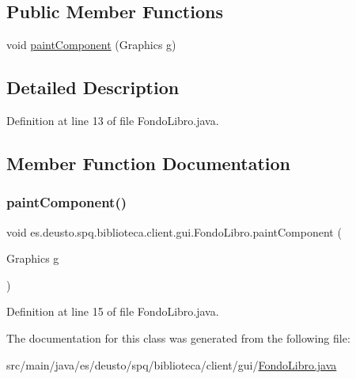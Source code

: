 \subsection*{Public Member Functions}
\begin{DoxyCompactItemize}
\item 
void \mbox{\hyperlink{classes_1_1deusto_1_1spq_1_1biblioteca_1_1client_1_1gui_1_1_fondo_libro_ace9f012294362dac9d16fb3876527435}{paint\+Component}} (Graphics g)
\end{DoxyCompactItemize}


\subsection{Detailed Description}


Definition at line 13 of file Fondo\+Libro.\+java.



\subsection{Member Function Documentation}
\mbox{\label{classes_1_1deusto_1_1spq_1_1biblioteca_1_1client_1_1gui_1_1_fondo_libro_ace9f012294362dac9d16fb3876527435}} 
\subsubsection{\texorpdfstring{paint\+Component()}{paintComponent()}}
{\footnotesize\ttfamily void es.\+deusto.\+spq.\+biblioteca.\+client.\+gui.\+Fondo\+Libro.\+paint\+Component (\begin{DoxyParamCaption}\item[{Graphics}]{g }\end{DoxyParamCaption})}



Definition at line 15 of file Fondo\+Libro.\+java.



The documentation for this class was generated from the following file\+:\begin{DoxyCompactItemize}
\item 
src/main/java/es/deusto/spq/biblioteca/client/gui/\mbox{\hyperlink{_fondo_libro_8java}{Fondo\+Libro.\+java}}\end{DoxyCompactItemize}
